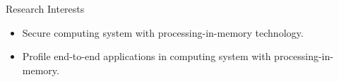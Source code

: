 \documentclass{resume} %
\begin{document}
\begin{rSection}{Research Interests}
\begin{itemize}
    \item Secure computing system with processing-in-memory technology.
    \item Profile end-to-end applications in computing system with processing-in-memory.
\end{itemize}
\end{rSection}



\end{document}
